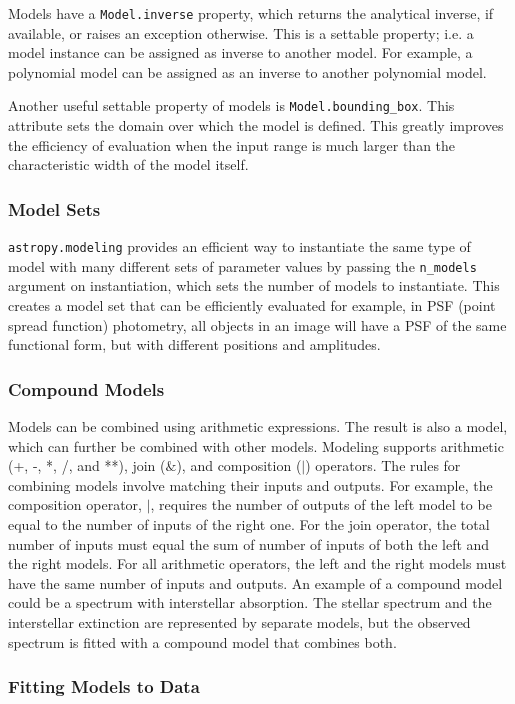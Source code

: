 \documentclass[modern]{aastex61}
\newcommand{\package}[1]{\texttt{#1}\xspace}
\begin{document}
Models have a \texttt{Model.inverse} property, which returns the analytical inverse, if available, or raises an exception otherwise. This is a settable property; i.e. a model instance can be assigned as inverse to another model. For example, a polynomial model can be assigned as an inverse to another polynomial model.

Another useful settable property of models is \texttt{Model.bounding\_box}. This attribute sets the domain over which the model is defined. This greatly improves the efficiency of evaluation when the input range is much larger than the characteristic width of the model itself.

\subsubsection{Model Sets}

\package{astropy.modeling} provides an efficient way to instantiate the same type of model with many different sets of parameter values by passing the \texttt{n\_models} argument on instantiation, which sets the number of models to instantiate. This creates a model set that can be efficiently evaluated for example, in PSF (point spread function) photometry, all objects in an image will have a PSF of the same functional form, but with different positions and amplitudes.

\subsubsection{Compound Models}
Models can be combined using arithmetic expressions. The result is also a model, which can further be combined with other models. Modeling supports arithmetic (+, -, *, /, and **), join ($\&$), and composition ($|$) operators. The rules for combining models involve matching their inputs and outputs. For example, the composition operator, $|$, requires the number of outputs of the left model to be equal to the number of inputs of the right one. For the join operator, the total number of inputs must equal the sum of number of inputs of both the left and the right models. For all arithmetic operators, the left and the right models must have the same number of inputs and outputs. An example of a compound model could be a spectrum with interstellar absorption. The stellar spectrum and the interstellar extinction are represented by separate models, but the observed spectrum is fitted with a compound model that combines both.

\subsubsection{Fitting Models to Data}
\end{document}
